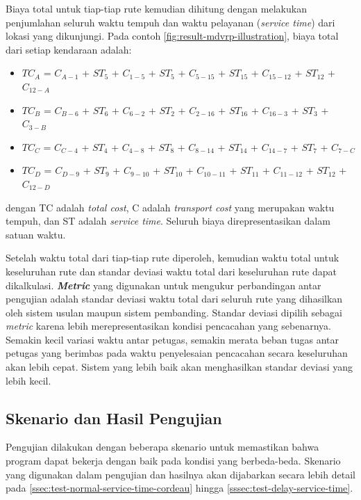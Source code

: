Biaya total untuk tiap-tiap rute kemudian dihitung dengan melakukan penjumlahan seluruh waktu tempuh dan waktu pelayanan (\textit{service time}) dari lokasi yang dikunjungi. Pada contoh \autoref{fig:result-mdvrp-illustration}, biaya total dari setiap kendaraan adalah:

\begin{itemize}
	\item $TC_A$ = $C_{A-1}$ + $ST_5$ + $C_{1-5}$ + $ST_5$ + $C_{5-15}$ + $ST_15$ + $C_{15-12}$ + $ST_12$ + $C_{12-A}$
	\item $TC_B$ = $C_{B-6}$ + $ST_6$ + $C_{6-2}$ + $ST_2$ + $C_{2-16}$ + $ST_16$ + $C_{16-3}$ + $ST_3$ + $C_{3-B}$
	\item $TC_C$ = $C_{C-4}$ + $ST_4$ + $C_{4-8}$ + $ST_8$ + $C_{8-14}$ + $ST_14$ + $C_{14-7}$ + $ST_7$ + $C_{7-C}$
	\item $TC_D$ = $C_{D-9}$ + $ST_9$ + $C_{9-10}$ + $ST_10$ + $C_{10-11}$ + $ST_11$ + $C_{11-12}$ + $ST_12$ + $C_{12-D}$
\end{itemize}
dengan TC adalah \textit{total cost}, C adalah \textit{transport cost} yang merupakan waktu tempuh, dan ST adalah \textit{service time}. Seluruh biaya direpresentasikan dalam satuan waktu.


Setelah waktu total dari tiap-tiap rute diperoleh, kemudian waktu total untuk keseluruhan rute dan standar deviasi waktu total dari keseluruhan rute dapat dikalkulasi. \textbf{\textit{Metric}} yang digunakan untuk mengukur perbandingan antar pengujian adalah standar deviasi waktu total dari seluruh rute yang dihasilkan oleh sistem usulan maupun sistem pembanding. Standar deviasi dipilih sebagai \textit{metric} karena lebih merepresentasikan kondisi pencacahan yang sebenarnya. Semakin kecil variasi waktu antar petugas, semakin merata beban tugas antar petugas yang berimbas pada waktu penyelesaian pencacahan secara keseluruhan akan lebih cepat. Sistem yang lebih baik akan menghasilkan standar deviasi yang lebih kecil.


\subsection{Skenario dan Hasil Pengujian}
Pengujian dilakukan dengan beberapa skenario untuk memastikan bahwa program dapat bekerja dengan baik pada kondisi yang berbeda-beda. Skenario yang digunakan dalam pengujian dan hasilnya akan dijabarkan secara lebih detail pada \autoref{ssec:test-normal-service-time-cordeau} hingga \autoref{sssec:test-delay-service-time}.


